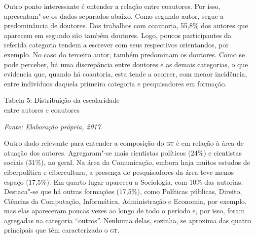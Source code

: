 Outro ponto interessante é entender a relação entre coautores. Por
isso, apresentam"-se os dados separados abaixo. Como segundo autor,
segue a predominância de doutores. Dos trabalhos com coautoria,
55,8\% dos autores que aparecem em segundo são também doutores.
Logo, poucos participantes da referida categoria tendem a escrever com
seus respectivos orientandos, por exemplo. No caso do
terceiro autor, também predominam os doutores. Como se pode
perceber, há uma discrepância entre doutores e as demais categorias,
o que evidencia que, quando há coautoria, esta tende a ocorrer, com
menor incidência, entre indivíduos daquela primeira categoria e
pesquisadores em formação.

\begin{center}
Tabela 5: Distribuição da escolaridade\\ entre autores e coautores\bigskip


{\footnotesize\emph{Fonte: Elaboração própria, 2017.}}
\end{center}

Outro dado relevante para entender a composição do \textsc{gt} é em relação à
área de atuação dos autores. Agregaram"-se mais cientistas
políticos (24\%) e cientistas sociais (31\%), no geral. Na área da
Comunicação, embora haja muitos estudos de ciberpolítica e cibercultura,
a presença de pesquisadores da área teve menos espaço (17,5\%). Em
quarto lugar apareceu a Sociologia, com 10\% das autorias. Destaca"-se
que há outras formações (17,5\%), como Políticas públicas, Direito,
Ciências da Computação, Informática, Administração e Economia, por
exemplo, mas elas apareceram poucas vezes ao longo de todo o período e,
por isso, foram agregadas na categoria ``outros''. Nenhuma delas,
sozinha, se aproxima das quatro principais que têm caracterizado o \textsc{gt}.

